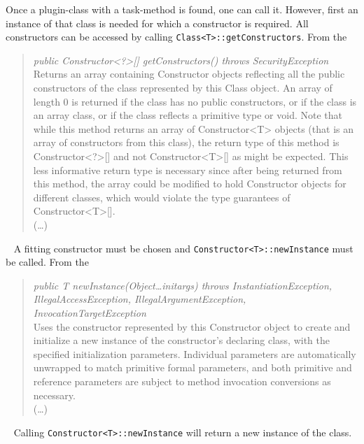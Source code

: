 Once a plugin-class with a task-method is found, one can call it.
However, first an instance of that class is needed for which a constructor is required.
All constructors can be accessed by calling \lstinline{Class<T>::getConstructors}.
From the \textcite{javadoc:class}
\begin{quote}
    \textit{public Constructor<?>[] getConstructors() throws SecurityException}\\
    Returns an array containing Constructor objects reflecting all the public constructors of the class represented by this Class object. An array of length 0 is returned if the class has no public constructors, or if the class is an array class, or if the class reflects a primitive type or void. Note that while this method returns an array of Constructor<T> objects (that is an array of constructors from this class), the return type of this method is Constructor<?>[] and not Constructor<T>[] as might be expected. This less informative return type is necessary since after being returned from this method, the array could be modified to hold Constructor objects for different classes, which would violate the type guarantees of Constructor<T>[].\\
    (\dots)
\end{quote}~\parencite{javadoc:class}
A fitting constructor must be chosen and \lstinline{Constructor<T>::newInstance} must be called.
From the \textcite{javadoc:constructor}
\begin{quote}
    \textit{public T newInstance(Object\dots initargs) throws InstantiationException, IllegalAccessException, IllegalArgumentException, InvocationTargetException}\\
    Uses the constructor represented by this Constructor object to create and initialize a new instance of the constructor's declaring class, with the specified initialization parameters. Individual parameters are automatically unwrapped to match primitive formal parameters, and both primitive and reference parameters are subject to method invocation conversions as necessary.\\
    (\dots)
\end{quote}~\parencite{javadoc:constructor}
Calling \lstinline{Constructor<T>::newInstance} will return a new instance of the class.

